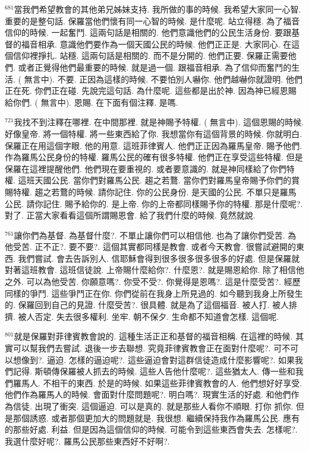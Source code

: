 \documentclass{book}
\begin{document}
$^{681}$當我們希望教會的其他弟兄姊妹支持.
我所做的事的時候.
我希望大家同一心智.
重要的是整句話.
保羅當他們懷有同一心智的時候.
是什麼呢.
站立得穩.
為了福音信仰的時候.
一起奮鬥.
這兩句話是相關的.
他們意識他們的公民生活身份.
要跟基督的福音相承.
意識他們要作為一個天國公民的時候.
他們正正是.
大家同心.
在這個信仰裡掙扎.
站穩.
這兩句話是相關的.
而不是分開的.
他們正要.
保羅正需要他們.
或者正覺得他們最重要的時候.
就是過一個.
跟福音相承.
為了信仰而奮鬥的生活.
( 無言中).
不要.
正因為這樣的時候.
不要怕別人嚇你.
他們越嚇你就證明.
他們正在死.
你們正在碰.
先說完這句話.
為什麼呢.
這些都是出於神.
因為神已經恩賜給你們.
( 無言中).
恩賜.
在下面有個注釋.
是嗎.

$^{721}$我找不到注釋在哪裡.
在中間那裡.
就是神賜予特權.
( 無言中).
這個恩賜的時候.
好像皇帝.
將一個特權.
將一些東西給了你.
我想當你有這個背景的時候.
你就明白.
保羅正在用這個字眼.
他的用意.
這班菲律賓人.
他們正正因為羅馬皇帝.
賜予他們.
作為羅馬公民身份的特權.
羅馬公民的確有很多特權.
他們正在享受這些特權.
但是保羅在這裡提醒他們.
他們現在要重視的.
或者要意識的.
就是神同樣給了你們特權.
這班天國公民.
當你們對羅馬公民.
趨之若鶩.
當你們對羅馬皇帝賜予你們的賞賜特權.
趨之若鶩的時候.
請你記住.
你的公民身份.
是天國的公民.
不單只是羅馬公民.
請你記住.
賜予給你的.
是上帝.
你的上帝都同樣賜予你的特權.
那是什麼呢?.
對了.
正當大家看看這個所謂賜恩會.
給了我們什麼的時候.
竟然就說.

$^{761}$讓你們為基督.
為基督什麼?.
不單止讓你們可以相信他.
也為了讓你們受苦.
為他受苦.
正不正?.
要不要?.
這個其實都同樣是教會.
或者今天教會.
很嘗試避開的東西.
我們嘗試.
會去告訴別人.
信耶穌會得到很多很多很多很多的好處.
但是保羅就對著這班教會.
這班信徒說.
上帝賜什麼給你?.
什麼恩?.
就是賜恩給你.
除了相信他之外.
可以為他受苦.
你願意嗎?.
你受不受?.
你覺得是恩嗎?.
這是什麼受苦?.
經歷同樣的爭鬥.
這些爭鬥正在你.
你們從前在我身上所見過的.
如今聽到我身上所發生的.
保羅回到自己的見證.
什麼受苦?.
很具體.
就是為了這個福音.
被人打.
被人排擠.
被人否定.
失去很多權利.
坐牢.
朝不保夕.
生命都不知道會怎樣.
這個呢.

$^{801}$就是保羅對菲律賓教會說的.
這種生活正正和基督的福音相稱.
在這裡的時候.
其實可以幫我們去嘗試.
退後一步去聯想.
究竟菲律賓教會正在面對什麼呢?.
可不可以想像到?.
逼迫.
怎樣的逼迫呢?.
這些逼迫會對這群信徒造成什麼影響呢?.
如果我們記得.
斯頓傳保羅被人抓去的時候.
這些人告他什麼呢?.
這些猶太人.
傳一些和我們羅馬人.
不相干的東西.
於是的時候.
如果這些菲律賓教會的人.
他們想好好享受.
他們作為羅馬人的時候.
會面對什麼問題呢?.
明白嗎?.
現實生活的好處.
和他們作為信徒.
出現了衝突.
這個逼迫.
可以是真的.
就是那些人看你不順眼.
打你 抓你.
但是那個誘惑.
或者那個更加大的問題就是.
我很想.
繼續保持我作為羅馬公民.
應有的那些好處.
利益.
但是因為這個信仰的時候.
可能令到這些東西會失去.
怎樣呢?.
我選什麼好呢?.
羅馬公民那些東西好不好啊?.
\end{document}

